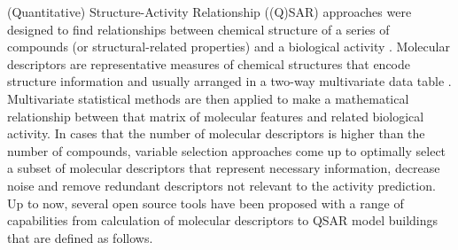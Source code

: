 (Quantitative) Structure-Activity Relationship ((Q)SAR) approaches were designed to find relationships between chemical structure of a series of compounds (or structural-related properties) and a biological activity \cite{1995}. Molecular descriptors are representative measures of chemical structures that encode structure information and usually arranged in a two-way multivariate data table \cite{Consonni_2009}. Multivariate statistical methods are then applied to make a mathematical relationship between that matrix of molecular features and related biological activity. In cases that the number of molecular descriptors is higher than the number of compounds, variable selection approaches come up to optimally select a subset of molecular descriptors that represent necessary information, decrease noise and remove redundant descriptors not relevant to the activity prediction. Up to now, several open source tools have been proposed with a range of capabilities from calculation of molecular descriptors to QSAR model buildings that are defined as follows. 